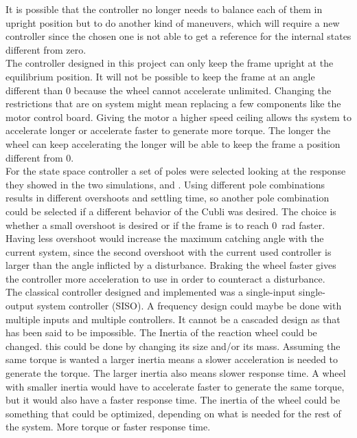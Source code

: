 It is possible that the controller no longer needs to balance each of them in upright position but to do another kind of maneuvers, which will require a new controller since the chosen one is not able to get a reference for the internal states different from zero.\\
The controller designed in this project can only keep the frame upright at the equilibrium position. It will not be possible to keep the frame at an angle different than \si{0^\circ} because the wheel cannot accelerate unlimited. Changing the restrictions that are on system might mean replacing a few components like the motor control board. Giving the motor a higher speed ceiling allows ths system to accelerate longer or accelerate faster to generate more torque. The longer the wheel can keep accelerating the longer will be able to keep the frame a position different from \si{0^\circ}.\\
For the state space controller a set of poles were selected looking at the response they showed in the two simulations,  and . Using different pole combinations results in different overshoots and settling time, so another pole combination could be selected if a different behavior of the Cubli was desired. 
The choice is whether a small overshoot is desired or if the frame is to reach \SI{0}{rad} faster. 
Having less overshoot would increase the maximum catching angle with the current system, since the second overshoot with the current used controller is larger than the angle inflicted by a disturbance. 
Braking the wheel faster gives the controller more acceleration to use in order to counteract a disturbance. \\
The classical controller designed and implemented was a single-input single-output system controller (SISO). A frequency design could maybe be done with multiple inputs and multiple controllers. It cannot be a cascaded design as that has been said to be impossible. 
The Inertia of the reaction wheel could be changed. this could be done by changing its size and/or its mass. Assuming the same torque is wanted a larger inertia means a slower acceleration is needed to generate the torque. The larger inertia also means slower response time. A wheel with smaller inertia would have to accelerate faster to generate the same torque, but it would also have a faster response time.  The inertia of the wheel could be something that could be optimized, depending on what is needed for the rest of the system. More torque or faster response time.

